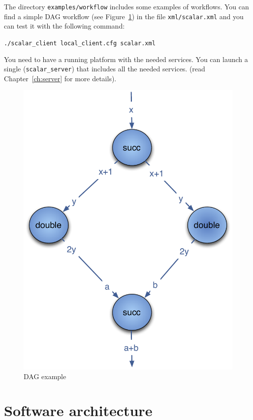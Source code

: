 The directory \texttt{examples/workflow} includes some examples of
workflows.  You can find a simple DAG workflow (see
Figure~\ref{fig:example1}) in the file \texttt{xml/scalar.xml} and you
can test it with the following command:

\verb|./scalar_client local_client.cfg scalar.xml |


You need to have a running \diet platform with the needed services. You
can launch a single \sed (\texttt{scalar\_server}) that includes all the
needed services. (read Chapter~\ref{ch:server} for more details).

\begin{figure}[htbp]
  \centering
  \includegraphics[keepaspectratio,width=0.4\linewidth]{fig/wf_example1}
  \caption{DAG example}
  \label{fig:example1}
\end{figure}

\section{Software architecture}


